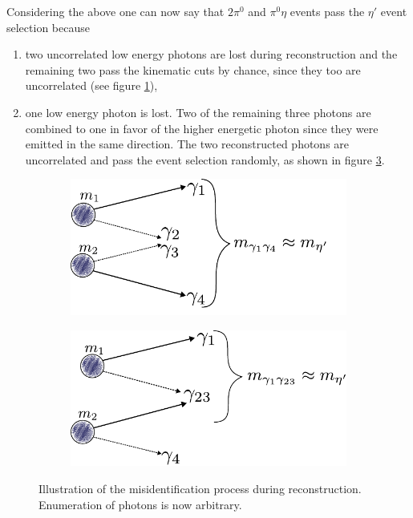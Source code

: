 Considering the above one can now say that $2\pi^0$ and $\pi^0\eta$ events pass the $\eta'$ event selection because 
\begin{enumerate}
	\item two uncorrelated low energy photons are lost during reconstruction and the remaining two pass the kinematic cuts by chance, since they too are uncorrelated (see figure \ref{fig:mcgammas1}),

	\item one low energy photon is lost. Two of the remaining three photons are combined to one in favor of the higher energetic photon since they were emitted in the same direction. The two reconstructed photons are uncorrelated and pass the event selection randomly, as shown in figure \ref{fig:mcgammas2}.
\end{enumerate} 
	\begin{figure}[htbp]
	\centering
	\begin{subfigure}{.49\linewidth}
		\includegraphics[width=\linewidth]{../figs/inkscape/mcgammas1.pdf}
		\label{fig:mcgammas1}
	\end{subfigure}
	\begin{subfigure}{.49\linewidth}
		\includegraphics[width=\linewidth]{../figs/inkscape/mcgammas2.pdf}
		\label{fig:mcgammas2}
	\end{subfigure}
	\caption{Illustration of the misidentification process during reconstruction. Enumeration of photons is now arbitrary.}

\end{figure}
